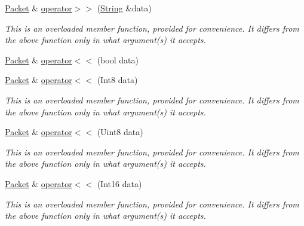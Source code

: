 \begin{DoxyCompactItemize}
\mbox{\label{classsf_1_1_packet_a081233e0cab2182a219b129a1383dc0b}} 
\mbox{\hyperlink{classsf_1_1_packet}{Packet}} \& \mbox{\hyperlink{classsf_1_1_packet_a081233e0cab2182a219b129a1383dc0b}{operator$>$$>$}} (\mbox{\hyperlink{classsf_1_1_string}{String}} \&data)
\begin{DoxyCompactList}\small\item\em This is an overloaded member function, provided for convenience. It differs from the above function only in what argument(s) it accepts. \end{DoxyCompactList}\item 
\mbox{\hyperlink{classsf_1_1_packet}{Packet}} \& \mbox{\hyperlink{classsf_1_1_packet_aa5a465ed02ba29d83ecdafb0ac3fff21}{operator$<$$<$}} (bool data)
\item 
\mbox{\label{classsf_1_1_packet_a034b68a4281cae0b53a43af7aa4172f6}} 
\mbox{\hyperlink{classsf_1_1_packet}{Packet}} \& \mbox{\hyperlink{classsf_1_1_packet_a034b68a4281cae0b53a43af7aa4172f6}{operator$<$$<$}} (Int8 data)
\begin{DoxyCompactList}\small\item\em This is an overloaded member function, provided for convenience. It differs from the above function only in what argument(s) it accepts. \end{DoxyCompactList}\item 
\mbox{\label{classsf_1_1_packet_af27e4498bf83151b0591d5f04a8b30e1}} 
\mbox{\hyperlink{classsf_1_1_packet}{Packet}} \& \mbox{\hyperlink{classsf_1_1_packet_af27e4498bf83151b0591d5f04a8b30e1}{operator$<$$<$}} (Uint8 data)
\begin{DoxyCompactList}\small\item\em This is an overloaded member function, provided for convenience. It differs from the above function only in what argument(s) it accepts. \end{DoxyCompactList}\item 
\mbox{\label{classsf_1_1_packet_afda8754ab4f2a34600f0153ba9ff24fa}} 
\mbox{\hyperlink{classsf_1_1_packet}{Packet}} \& \mbox{\hyperlink{classsf_1_1_packet_afda8754ab4f2a34600f0153ba9ff24fa}{operator$<$$<$}} (Int16 data)
\begin{DoxyCompactList}\small\item\em This is an overloaded member function, provided for convenience. It differs from the above function only in what argument(s) it accepts. \end{DoxyCompactList}\item 

\end{DoxyCompactItemize}
